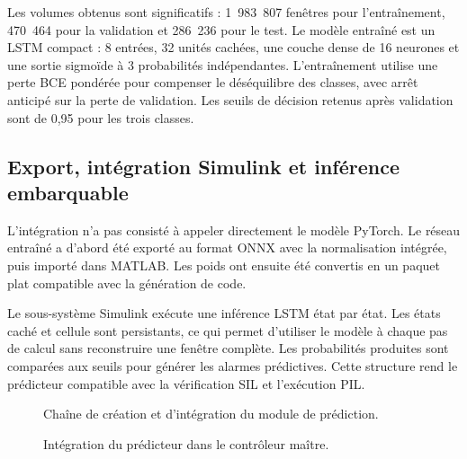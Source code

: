 \noindent
Les volumes obtenus sont significatifs : 1~983~807 fenêtres pour l'entraînement, 470~464 pour la validation et 286~236 pour le test. Le modèle entraîné est un LSTM compact : 8 entrées, 32 unités cachées, une couche dense de 16 neurones et une sortie sigmoïde à 3 probabilités indépendantes. L'entraînement utilise une perte BCE pondérée pour compenser le déséquilibre des classes, avec arrêt anticipé sur la perte de validation. Les seuils de décision retenus après validation sont de 0{,}95 pour les trois classes.

\subsection{Export, intégration Simulink et inférence embarquable}
\label{subsec:ch4_modele_lstm}

L'intégration n'a pas consisté à appeler directement le modèle PyTorch. Le réseau entraîné a d'abord été exporté au format ONNX avec la normalisation intégrée, puis importé dans MATLAB. Les poids ont ensuite été convertis en un paquet plat compatible avec la génération de code.

\noindent
Le sous-système Simulink exécute une inférence LSTM état par état. Les états caché et cellule sont persistants, ce qui permet d'utiliser le modèle à chaque pas de calcul sans reconstruire une fenêtre complète. Les probabilités produites sont comparées aux seuils pour générer les alarmes prédictives. Cette structure rend le prédicteur compatible avec la vérification SIL et l'exécution PIL.

\begin{figure}[H]
  \centering
  \captionsetup{width=0.82\textwidth, skip=15pt}
  \caption{Chaîne de création et d'intégration du module de prédiction.}
  \label{fig:ch4_chaine_prediction}
\end{figure}

\begin{figure}[H]
  \centering
  \captionsetup{width=0.82\textwidth, skip=15pt}
  \caption{Intégration du prédicteur dans le contrôleur maître.}
  \label{fig:ch4_placeholder_predictor}
\end{figure}

